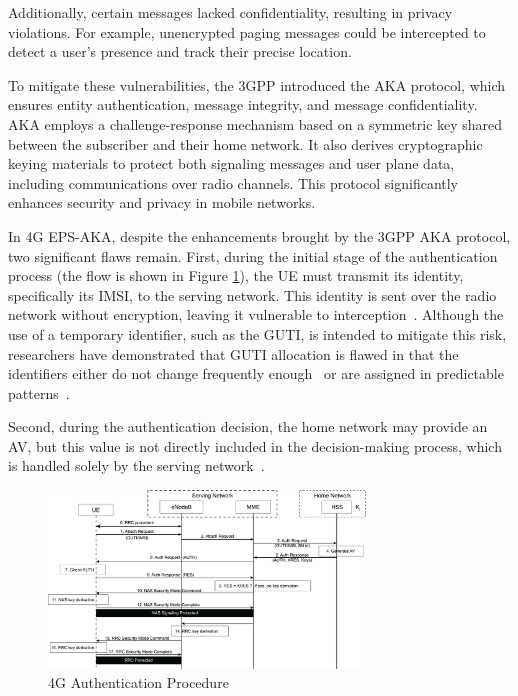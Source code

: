 Additionally, certain messages lacked confidentiality, resulting in privacy violations. For example, unencrypted paging messages could be intercepted to detect a user’s presence and track their precise location.

To mitigate these vulnerabilities, the 3GPP introduced the \ac{AKA} protocol, which ensures entity authentication, message integrity, and message confidentiality. \ac{AKA} employs a challenge-response mechanism based on a symmetric key shared between the subscriber and their home network. It also derives cryptographic keying materials to protect both signaling messages and user plane data, including communications over radio channels. This protocol significantly enhances security and privacy in mobile networks.

In \ac{4G} \ac{EPS-AKA}, despite the enhancements brought by the 3GPP \ac{AKA} protocol, two significant flaws remain. First, during the initial stage of the authentication process (the flow is shown in Figure \ref{fig:4G-authentication-procedure}), the \ac{UE} must transmit its identity, specifically its \ac{IMSI}, to the serving network. This identity is sent over the radio network without encryption, leaving it vulnerable to interception~\cite{cbl-comp-4G-5g-p3}. Although the use of a temporary identifier, such as the \ac{GUTI}, is intended to mitigate this risk, researchers have demonstrated that \ac{GUTI} allocation is flawed in that the identifiers either do not change frequently enough~\cite{gt-freq} or are assigned in predictable patterns~\cite{gt-pred}.

Second, during the authentication decision, the home network may provide an \ac{AV}, but this value is not directly included in the decision-making process, which is handled solely by the serving network~\cite{cbl-comp-4G-5g-p4}.

\begin{figure}[htbp]
    \centering
    \includegraphics[width=0.75\textwidth]{figs/4G-authentication-procedure.png}
    \caption{\ac{4G} Authentication Procedure}
    \label{fig:4G-authentication-procedure}
\end{figure}

